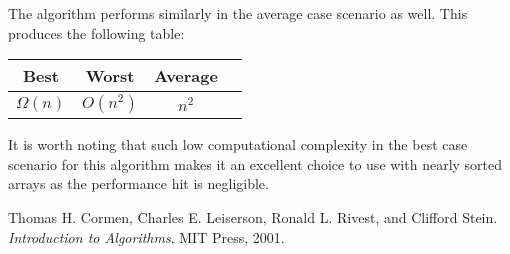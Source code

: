 \documentclass[titlepage, a4paper, 12pt]{article}
\begin{document}
    The algorithm performs similarly in the average case scenario as well. This produces the following table:

    \begin{table}[h]
        \centering
        \begin{tabular}{|c|c|c|c|}
            \hline
            \textbf{Best} & \textbf{Worst} & \textbf{Average} \\
            \hline
            \small$\Omega(n)$ & \small$O(n^2)$ & \small$n^2$ \\
            \hline
        \end{tabular}
    \end{table}

    It is worth noting that such low computational complexity in the best case scenario for this algorithm makes it an excellent choice to use with nearly sorted arrays as the performance hit is negligible.

    \clearpage
    \begin{thebibliography}{1}
        Thomas H. Cormen, Charles E. Leiserson, Ronald L. Rivest, and Clifford Stein.
        \newblock \emph{Introduction to Algorithms}.
        \newblock MIT Press, 2001.
    \end{thebibliography}
\end{document}

